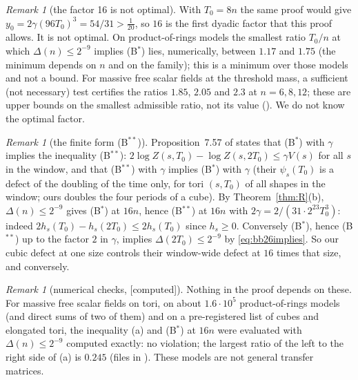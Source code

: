 \documentclass[11pt,a4paper]{article}
\theoremstyle{plain}
\theoremstyle{definition}
\theoremstyle{remark}
\newtheorem{remark}[theorem]{Remark}
\numberwithin{equation}{section}
\newcommand{\st}[1]{\textsf{[#1]}}
\begin{document}
\begin{remark}[the factor 16 is not optimal]\label{rem:16}
With $T_0=8n$ the same proof would give $y_0=2\gamma(96T_0)^3=54/31>\frac1{20}$, so $16$ is the first dyadic factor that this proof allows. It is not optimal. On product-of-rings models the smallest ratio $T_0/n$ at which $\Delta(n)\le2^{-9}$ implies (B$^*$) lies, numerically, between $1.17$ and $1.75$ (the minimum depends on $n$ and on the family); this is a minimum over those models and not a bound. For massive free scalar fields at the threshold mass, a sufficient (not necessary) test certifies the ratios $1.85$, $2.05$ and $2.3$ at $n=6,8,12$; these are upper bounds on the smallest admissible ratio, not its value (). We do not know the optimal factor.
\end{remark}

\begin{remark}[the finite form (B$^{**}$)]\label{rem:Bss}
Proposition~7.57 of \cite{BB26v5} states that (B$^*$) with $\gamma$ implies the inequality (B$^{**}$): $2\log Z(s,T_0)-\log Z(s,2T_0)\le\gamma V(s)$ for all $s$ in the window, and that (B$^{**}$) with $\gamma$ implies (B$^*$) with $\gamma$ (their $\psi_s(T_0)$ is a defect of the doubling of the time only, for tori $(s,T_0)$ of all shapes in the window; ours doubles the four periods of a cube). By Theorem~\ref{thm:R}(b), $\Delta(n)\le2^{-9}$ gives (B$^*$) at $16n$, hence (B$^{**}$) at $16n$ with $2\gamma=2/(31\cdot2^{23}T_0^3)$: indeed $2h_s(T_0)-h_s(2T_0)\le2h_s(T_0)$ since $h_s\ge0$. Conversely (B$^*$), hence (B$^{**}$) up to the factor $2$ in $\gamma$, implies $\Delta(2T_0)\le2^{-9}$ by \eqref{eq:bb26implies}. So our cubic defect at one size controls their window-wide defect at $16$ times that size, and conversely.
\end{remark}

\begin{remark}[numerical checks, \st{computed}]\label{rem:Rnum}
Nothing in the proof depends on these. For massive free scalar fields on tori, on about $1.6\cdot10^5$ product-of-rings models (and direct sums of two of them) and on a pre-registered list of cubes and elongated tori, the inequality (a) and (B$^*$) at $16n$ were evaluated with $\Delta(n)\le2^{-9}$ computed exactly: no violation; the largest ratio of the left to the right side of (a) is $0.245$ (files in ). These models are not general transfer matrices.
\end{remark}
\end{document}
